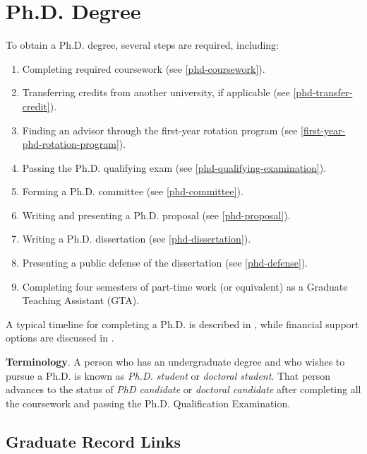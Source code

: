 
\hypertarget{phd-degree}{
\section{Ph.D. Degree}
\label{phd-degree}
}

To obtain a Ph.D. degree, several steps are required, including:

\begin{enumerate}[nosep]
    \item Completing required coursework (see \cref{phd-coursework}).
    \item Transferring credits from another university, if applicable (see \cref{phd-transfer-credit}).
    \item Finding an advisor through the first-year rotation program (see \cref{first-year-phd-rotation-program}).
    \item Passing the Ph.D. qualifying exam (see \cref{phd-qualifying-examination}).
    \item Forming a Ph.D. committee (see \cref{phd-committee}).
    \item Writing and presenting a Ph.D. proposal (see \cref{phd-proposal}).
    \item Writing a Ph.D. dissertation (see \cref{phd-dissertation}).
    \item Presenting a public defense of the dissertation (see \cref{phd-defense}).
    \item Completing four semesters of part-time work (or equivalent) as a Graduate Teaching Assistant (GTA).
\end{enumerate}

A typical timeline for completing a Ph.D. is described in ,
while financial support options are discussed in .

\textbf{Terminology}. A person who has an undergraduate degree and who
wishes to pursue a Ph.D. is known as \emph{Ph.D. student} or
\emph{doctoral student}. That person advances to the status of \emph{PhD
candidate} or \emph{doctoral candidate} after completing all the coursework
and passing the Ph.D. Qualification Examination.

\hypertarget{phd-graduate-record}{%
\subsection{Graduate Record Links}
\label{phd-graduate-record}
}

